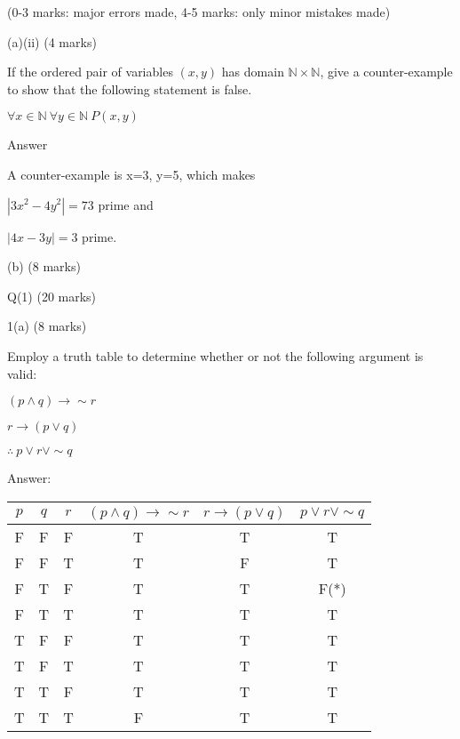 \documentclass[a4paper,12pt,oneside]{book}
\theoremstyle{definition}
\begin{document}
(0-3 marks: major errors made, 4-5 marks: only minor mistakes made)

(a)(ii) (4 marks)

If the ordered pair of variables $(x,y)$ has domain $\mathbb{N} \times \mathbb{N}$, give a counter-example to show that the following statement is false.

$\forall x \in \mathbb{N} \ \forall y \in \mathbb{N} \ P(x,y)$

Answer

A counter-example is x=3, y=5, which makes

$|3x^2-4y^2| = 73$ prime and

$|4x-3y| = 3$ prime.

(b) (8 marks)











































\newpage




Q(1) (20 marks)

1(a) (8 marks)

Employ a truth table to determine whether or not the following argument is valid:

$(p \wedge q) \longrightarrow \sim r$

$r \longrightarrow (p \vee q)$

$\therefore \ p \vee r \vee \sim q$

Answer:

\begin{center}
	\begin{tabular}{|ccc|c|c|c|}
		\hline
		$p$ & $q$ & $r$ &$(p \wedge q) \longrightarrow \sim r$ & $r \longrightarrow (p \vee q)$ & $p \vee r \vee \sim q$ \\
		\hline
		F & F & F & T & T & T \\
		\hline
		F & F & T & T & F & T \\
		\hline
		F & T & F & T & T & F(*) \\
		\hline
		F & T & T & T & T & T \\
		\hline
		T & F & F & T & T & T \\
		\hline
		T & F & T & T & T & T \\
		\hline
		T & T & F & T & T & T \\
		\hline
		T & T & T & F & T & T \\
		\hline  
	\end{tabular} 
\end{center}
\end{document}
